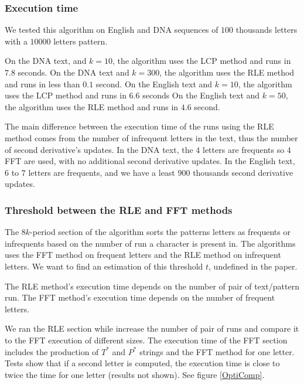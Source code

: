\documentclass[preprint,12pt]{elsarticle}
\begin{document}
\subsubsection*{Execution time}

We tested this algorithm on English and DNA sequences of $100$ thousands letters with a $10 000$ letters pattern.

On the DNA text, and $k = 10$, the algorithm uses the LCP method and runs in $7.8$ seconds.
On the DNA text and $k = 300$, the algorithm uses the RLE method and runs in less than $0.1$ second.
On the English text and $k = 10$, the algorithm uses the LCP method and runs in $6.6$ seconds
On the English text and $k = 50$, the algorithm uses the RLE method and runs in $4.6$ second.

The main difference between the execution time of the runs using the RLE method %
comes from the number of infrequent letters in the text, thus the number of second derivative's updates.
In the DNA text, the $4$ letters are frequents so $4$ FFT are used,
with no additional second derivative updates.
In the English text, $6$ to $7$ letters are frequents, and we have a least $900$ thousands second derivative updates.



\subsubsection*{Threshold between the RLE and FFT methods}

The $8k$-period section of the algorithm sorts the patterns letters as frequents or infrequents
based on the number of run a character is present in. 
The algorithms uses the FFT method on frequent letters
and the RLE method on infrequent letters.
We want to find an estimation of this threshold $t$, undefined in the paper.




The RLE method's execution time depends on the number of pair of text/pattern run.
The FFT method's execution time depends on the number of frequent letters.

We ran the RLE section while increase the number of pair of runs and compare it
to the FFT execution of different sizes.
The execution time of the FFT section includes the production of $T^*$ and $P^*$ strings
and the FFT method for one letter.
Tests show that if a second letter is computed, the execution time is close to twice the time for one letter
(results not shown).
See figure \ref{OptiComp}.
\end{document}

